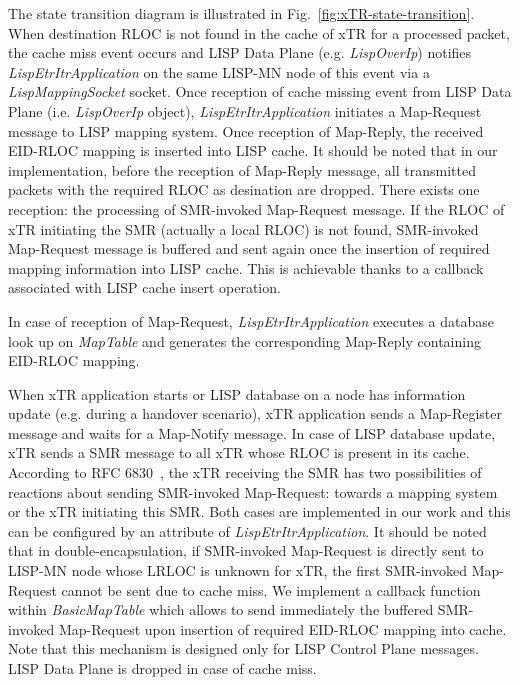 The state transition diagram is illustrated in Fig.~\ref{fig:xTR-state-transition}. When destination RLOC is not found in the cache of xTR for a processed packet, the cache miss event occurs and LISP Data Plane (e.g. \emph{LispOverIp}) notifies \emph{LispEtrItrApplication} on the same LISP-MN node of this event via a \emph{LispMappingSocket} socket. Once reception of cache missing event from LISP Data Plane (i.e. \emph{LispOverIp} object), \emph{LispEtrItrApplication} initiates a Map-Request message to LISP mapping system. Once reception of Map-Reply, the received EID-RLOC mapping is inserted into LISP cache. It should be noted that in our implementation, before the reception of Map-Reply message, all transmitted packets with the required RLOC as desination are dropped. There exists one reception: the processing of SMR-invoked Map-Request message. If the RLOC of xTR initiating the SMR (actually a local RLOC) is not found, SMR-invoked Map-Request message is buffered and sent again once the insertion of required mapping information into LISP cache. This is achievable thanks to a callback associated with LISP cache insert operation.

In case of reception of Map-Request, \emph{LispEtrItrApplication} executes a database look up on \emph{MapTable} and generates the corresponding Map-Reply containing EID-RLOC mapping.

When xTR application starts or LISP database on a node has information update (e.g. during a handover scenario), xTR application sends a Map-Register message and waits for a Map-Notify message. In case of LISP database update, xTR sends a SMR message to all xTR whose RLOC is present in its cache. %
According to RFC 6830~\cite{rfc6830}, the xTR receiving the SMR has two possibilities of reactions about sending SMR-invoked Map-Request:  towards a mapping system or the xTR initiating this SMR. Both cases are implemented in our work and this can be configured by an attribute of \emph{LispEtrItrApplication}. It should be noted that in double-encapsulation, if SMR-invoked Map-Request is directly sent to LISP-MN node whose LRLOC is unknown for xTR, the first SMR-invoked Map-Request cannot be sent due to cache miss. We implement a callback function within \emph{BasicMapTable} which allows to send immediately the buffered SMR-invoked Map-Request upon insertion of required EID-RLOC mapping into cache. Note that this mechanism is designed only for LISP Control Plane messages. LISP Data Plane is dropped in case of cache miss.

